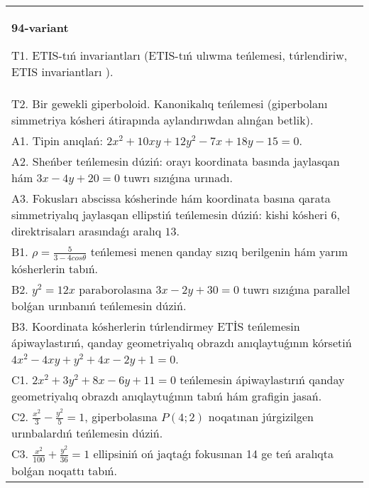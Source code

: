 \documentclass{article}
\begin{document}
\begin{tabular}{m{17cm}}
\textbf{94-variant}
\newline

T1. ETIS-tıń invariantları (ETIS-tıń ulıwma teńlemesi, túrlendiriw, ETIS invariantları ).\\

T2. Bir gewekli giperboloid. Kanonikalıq teńlemesi (giperbolanı simmetriya kósheri átirapında aylandırıwdan alınǵan betlik).\\

A1. Tipin anıqlań: $2 x^{2}+10 xy+12 y^{2}-7 x+18 y-15=0$.\\

A2. Sheńber teńlemesin dúziń: orayı koordinata basında jaylasqan hám $3 x-4 y+20=0$ tuwrı sızıǵına urınadı.\\

A3. Fokusları abscissa kósherinde hám koordinata basına qarata simmetriyalıq jaylasqan ellipstiń teńlemesin dúziń: kishi kósheri $6$, direktrisaları arasındaǵı aralıq $13$.\\

B1. $\rho = \frac{5}{3 - 4cos\theta}$ teńlemesi menen qanday sızıq berilgenin hám yarım kósherlerin tabıń.  \\

B2. $y^{2} = 12x$ paraborolasına $3x - 2y + 30 = 0$ tuwrı sızıǵına parallel bolǵan urınbanıń teńlemesin dúziń.  \\

B3. Koordinata kósherlerin túrlendirmey ETİS teńlemesin ápiwaylastırıń, qanday geometriyalıq obrazdı anıqlaytuǵının kórsetiń $4x^{2} - 4xy + y^{2} + 4x - 2y + 1 = 0$.  \\

C1. $2x^{2} + 3y^{2} + 8x - 6y + 11 = 0$ teńlemesin ápiwaylastırıń qanday geometriyalıq obrazdı anıqlaytuǵının tabıń hám grafigin jasań.  \\

C2. $\frac{x^{2}}{3} - \frac{y^{2}}{5} = 1$, giperbolasına $P(4;2)$ noqatınan júrgizilgen urınbalardıń teńlemesin dúziń.  \\

C3. $\frac{x^{2}}{100} + \frac{y^{2}}{36} = 1$ ellipsiniń oń jaqtaǵı fokusınan 14 ge teń aralıqta bolǵan noqattı tabıń.  \\

\end{tabular}
\vspace{1cm}
\end{document}
